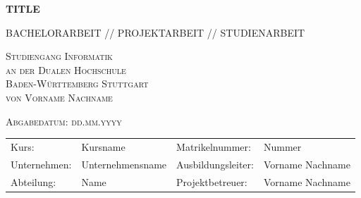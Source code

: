 \documentclass[12pt]{report}
\begin{document}
 
	\begin{titlepage}
		\thispagestyle{titlepage}
		\newcommand\HRule{\rule{\textwidth}{1pt}} %

		
		\begin{center}
			
			\vspace*{2cm}
			
			{ \huge \bfseries TITLE}
			
			\vspace*{1.5cm}
			
			\textsc{\Large BACHELORARBEIT // PROJEKTARBEIT // STUDIENARBEIT}
			
			\vspace*{3cm}
			
			\textsc{\LARGE Studiengang Informatik}\\[0.3cm]
			\textsc{\LARGE an der Dualen Hochschule}\\[0.3cm]
			\textsc{\LARGE Baden-Württemberg Stuttgart}\\[2.5cm]

			
			\textsc{\Large von Vorname Nachname}
			
			\vspace*{1.5cm}
			
			\textsc{\Large Abgabedatum: dd.mm.yyyy}

			\begin{table}[bp]
				\begin{tabular}{l l l l}
					Kurs: & Kursname & Matrikelnummer: & Nummer  \\
					Unternehmen: & Unternehmensname & Ausbildungsleiter: & Vorname Nachname\\
					Abteilung: &  Name & Projektbetreuer: &  Vorname Nachname\\
				\end{tabular}
			\end{table}
			
			
		\end{center}
		
	\end{titlepage}



\fancypagestyle{plain}{
	\fancyfoot[L]{Vorname Nachname\\
		 - Kurs}
	\fancyfoot[C]{Seite \thepage\ }%
	\fancyfoot[R]{04.09.2023}
}
\end{document}
